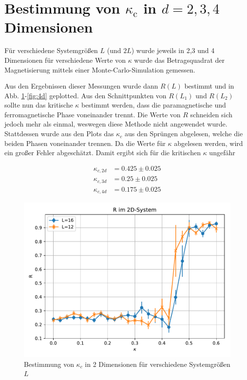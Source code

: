 \documentclass[10pt,a4paper]{article}
\begin{document}
\section{Bestimmung von $\kappa_\text{c}$ in $d=2,3,4$ Dimensionen}

Für verschiedene Systemgrößen $L$ (und $2L$) wurde jeweils in 2,3 und 4 Dimensionen für verschiedene
Werte von $\kappa$ wurde das Betragsquadrat der Magnetisierung mittels
einer Monte-Carlo-Simulation gemessen.

Aus den Ergebnissen dieser Messungen wurde dann $R(L)$ bestimmt und in
Abb. \ref{fig:2d}-\ref{fig:4d} geplotted.
Aus den Schnittpunkten von $R(L_1)$ und $R(L_2)$ sollte nun das kritische $\kappa$
bestimmt werden, dass die paramagnetische und ferromagnetische Phase voneinander
trennt. Die Werte von $R$ schneiden sich jedoch mehr als einmal, weswegen diese
Methode nicht angewendet wurde. Stattdessen wurde aus den Plots das $\kappa_c$
aus den Sprüngen abgelesen, welche die beiden Phasen voneinander trennen.
Da die Werte für $\kappa$ abgelesen werden, wird ein großer Fehler abgeschätzt.
\newpage
Damit ergibt sich für die kritischen $\kappa$ ungefähr

\begin{align*}
  \kappa_{c,2d} &= 0.425 \pm 0.025 \\
  \kappa_{c,3d} &= 0.25 \pm 0.025\\
  \kappa_{c,4d} &= 0.175 \pm 0.025
\end{align*}


\begin{figure}
  \centering
  \includegraphics[width=\textwidth]{../figures/2dR.pdf}
  \caption{Bestimmung von $\kappa_c$ in 2 Dimensionen für verschiedene Systemgrößen $L$}\label{fig:2d}
\end{figure}
\end{document}
